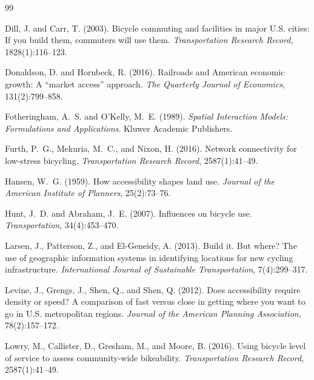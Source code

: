 \documentclass[12pt,a4paper]{article}
\begin{document}
\begin{thebibliography}{99}

Dill, J. and Carr, T. (2003).
\newblock Bicycle commuting and facilities in major {U.S.} cities: If you build them, commuters will use them.
\newblock \textit{Transportation Research Record}, 1828(1):116--123.

Donaldson, D. and Hornbeck, R. (2016).
\newblock Railroads and {A}merican economic growth: A ``market access'' approach.
\newblock \textit{The Quarterly Journal of Economics}, 131(2):799--858.

Fotheringham, A.~S. and O'Kelly, M.~E. (1989).
\newblock \textit{Spatial Interaction Models: Formulations and Applications}.
\newblock Kluwer Academic Publishers.

Furth, P.~G., Mekuria, M.~C., and Nixon, H. (2016).
\newblock Network connectivity for low-stress bicycling.
\newblock \textit{Transportation Research Record}, 2587(1):41--49.

Hansen, W.~G. (1959).
\newblock How accessibility shapes land use.
\newblock \textit{Journal of the American Institute of Planners}, 25(2):73--76.

Hunt, J.~D. and Abraham, J.~E. (2007).
\newblock Influences on bicycle use.
\newblock \textit{Transportation}, 34(4):453--470.

Larsen, J., Patterson, Z., and El-Geneidy, A. (2013).
\newblock Build it. {B}ut where? {T}he use of geographic information systems in identifying locations for new cycling infrastructure.
\newblock \textit{International Journal of Sustainable Transportation}, 7(4):299--317.

Levine, J., Grengs, J., Shen, Q., and Shen, Q. (2012).
\newblock Does accessibility require density or speed? {A} comparison of fast versus close in getting where you want to go in {U.S.} metropolitan regions.
\newblock \textit{Journal of the American Planning Association}, 78(2):157--172.

Lowry, M., Callister, D., Gresham, M., and Moore, B. (2016).
\newblock Using bicycle level of service to assess community-wide bikeability.
\newblock \textit{Transportation Research Record}, 2587(1):41--49.


\end{thebibliography}
\end{document}
